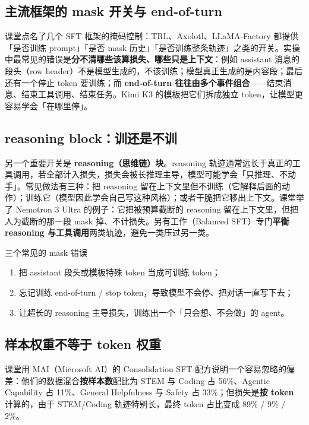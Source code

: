 \documentclass[a4paper]{article}
\begin{document}
\subsection{主流框架的 mask 开关与 end-of-turn}

课堂点名了几个 SFT 框架的掩码控制：TRL、Axolotl、LLaMA-Factory 都提供「是否训练 prompt」「是否 mask 历史」「是否训练整条轨迹」之类的开关。实操中最常见的错误是\textbf{分不清哪些该算损失、哪些只是上下文}：例如 assistant 消息的段头（row header）不是模型生成的，不该训练；模型真正生成的是内容段；最后还有一个停止 token 要训练；而 \textbf{end-of-turn 往往由多个事件组合}——结束消息、结束工具调用、结束任务。Kimi K3 的模板把它们拆成独立 token，让模型更容易学会「在哪里停」。

\subsection{reasoning block：训还是不训}

另一个重要开关是 \textbf{reasoning（思维链）块}。reasoning 轨迹通常远长于真正的工具调用，若全部计入损失，损失会被长推理主导，模型可能学会「只推理、不动手」。常见做法有三种：把 reasoning 留在上下文里但不训练（它解释后面的动作）；训练它（模型因此学会自己写这种风格）；或者干脆把它移出上下文。课堂举了 Nemotron 3 Ultra 的例子：它把被预算截断的 reasoning 留在上下文里，但把人为截断的那一段 mask 掉、不计损失。另有工作（Balanced SFT）专门\textbf{平衡 reasoning 与工具调用}两类轨迹，避免一类压过另一类。

\begin{warningbox}{三个常见的 mask 错误}
\begin{enumerate}
\item 把 assistant 段头或模板特殊 token 当成可训练 token；
\item 忘记训练 end-of-turn / stop token，导致模型不会停、把对话一直写下去；
\item 让超长的 reasoning 主导损失，训练出一个「只会想、不会做」的 agent。
\end{enumerate}
\end{warningbox}

\subsection{样本权重不等于 token 权重}

课堂用 MAI（Microsoft AI）的 Consolidation SFT 配方说明一个容易忽略的偏差：他们的数据混合\textbf{按样本数}配比为 STEM 与 Coding 占 56\%、Agentic Capability 占 11\%、General Helpfulness 与 Safety 占 33\%；但损失是\textbf{按 token} 计算的，由于 STEM/Coding 轨迹特别长，最终 token 占比变成 89\% / 9\% / 2\%。
\end{document}

